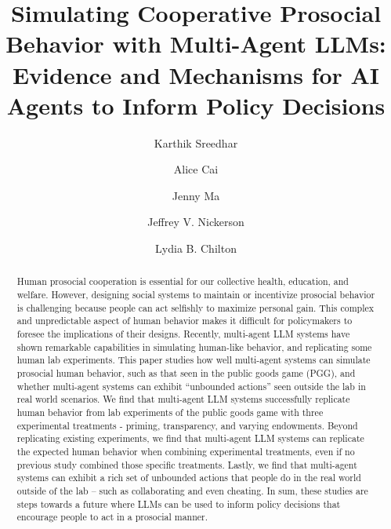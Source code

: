 \documentclass[sigconf]{acmart}
\begin{document}
\title{Simulating Cooperative Prosocial Behavior with Multi-Agent LLMs: Evidence and Mechanisms for AI Agents to Inform Policy Decisions}

\renewcommand{\shorttitle}{Multi-Agent Simulations of Cooperative Prosocial Behavior}

\author{Karthik Sreedhar}

\author{Alice Cai}

\author{Jenny Ma}


\author{Jeffrey V. Nickerson}

\author{Lydia B. Chilton}


\begin{abstract}
Human prosocial cooperation is essential for our collective health, education, and welfare. 
However, designing social systems to maintain or incentivize prosocial behavior is challenging because people can act selfishly to maximize personal gain.  
This complex and unpredictable aspect of human behavior makes it difficult for policymakers to foresee the implications of their designs.
Recently, multi-agent LLM systems have shown remarkable capabilities in simulating human-like behavior, and replicating some human lab experiments. 
This paper studies how well multi-agent systems can simulate prosocial human behavior, such as that seen in the public goods game (PGG), and whether multi-agent systems can exhibit ``unbounded actions'' seen outside the lab in real world scenarios. We find that multi-agent LLM systems successfully replicate human behavior from lab experiments of the public goods game with three experimental treatments - priming, transparency, and varying endowments. Beyond replicating existing experiments, we find that multi-agent LLM systems can replicate the expected human behavior when combining experimental treatments, even if no previous study combined those specific treatments. Lastly, we find that multi-agent systems can exhibit a rich set of unbounded actions that people do in the real world outside of the lab -- such as collaborating and even cheating. In sum, these studies are steps towards a future where LLMs can be used to inform policy decisions that encourage people to act in a prosocial manner.
\end{abstract}
\end{document}
